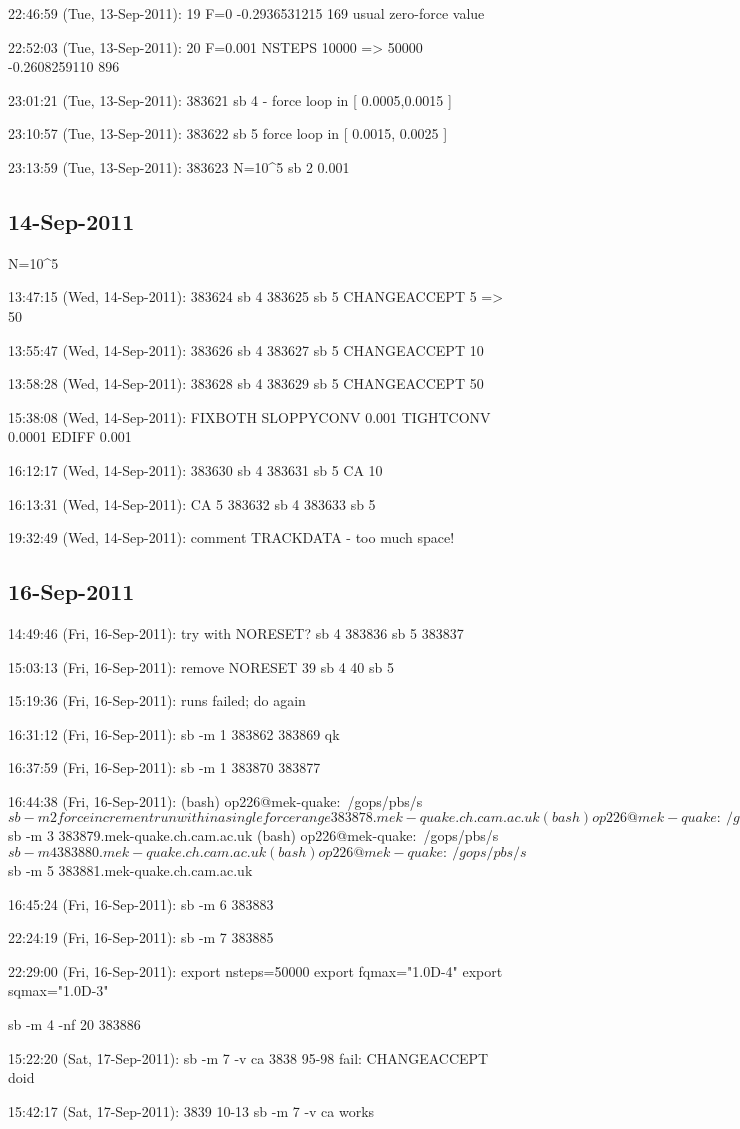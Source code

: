22:46:59 (Tue, 13-Sep-2011):
19 F=0
-0.2936531215 169  usual zero-force value 


22:52:03 (Tue, 13-Sep-2011):
	20
	F=0.001
	NSTEPS 10000 => 50000
-0.2608259110 896

23:01:21 (Tue, 13-Sep-2011):
	383621 sb 4 - force loop in [ 0.0005,0.0015 ]


23:10:57 (Tue, 13-Sep-2011):
	383622 sb 5 force loop in [ 0.0015, 0.0025 ] 


23:13:59 (Tue, 13-Sep-2011):
	383623
	N=10^5 sb 2 0.001


\subsection{14-Sep-2011}

N=10^5

13:47:15 (Wed, 14-Sep-2011):
383624 sb 4 
383625 sb 5 
CHANGEACCEPT 5 => 50

13:55:47 (Wed, 14-Sep-2011):
383626 sb 4
383627 sb 5
CHANGEACCEPT 10

13:58:28 (Wed, 14-Sep-2011):
383628 sb 4
383629 sb 5
CHANGEACCEPT 50


15:38:08 (Wed, 14-Sep-2011):
FIXBOTH
SLOPPYCONV 0.001
TIGHTCONV  0.0001
EDIFF 0.001


16:12:17 (Wed, 14-Sep-2011):
383630 sb 4
383631 sb 5
CA 10


16:13:31 (Wed, 14-Sep-2011):
CA 5
383632 sb 4
383633 sb 5

19:32:49 (Wed, 14-Sep-2011):
comment TRACKDATA - too much space!
\subsection{16-Sep-2011}

14:49:46 (Fri, 16-Sep-2011):
	try with NORESET?
	sb 4 383836
	sb 5 383837

15:03:13 (Fri, 16-Sep-2011):
	remove NORESET
	39 sb 4
	40 sb 5

15:19:36 (Fri, 16-Sep-2011):
runs failed; do again

16:31:12 (Fri, 16-Sep-2011):
	sb -m 1
	383862 383869
	qk

16:37:59 (Fri, 16-Sep-2011):
	sb -m 1
	383870 383877

16:44:38 (Fri, 16-Sep-2011):
	(bash) op226@mek-quake:~/gops/pbs/s$ sb -m 2
	force increment run within a single force range
	383878.mek-quake.ch.cam.ac.uk
	(bash) op226@mek-quake:~/gops/pbs/s$ sb -m 3
	383879.mek-quake.ch.cam.ac.uk
	(bash) op226@mek-quake:~/gops/pbs/s$ sb -m 4
	383880.mek-quake.ch.cam.ac.uk
	(bash) op226@mek-quake:~/gops/pbs/s$ sb -m 5
	383881.mek-quake.ch.cam.ac.uk

16:45:24 (Fri, 16-Sep-2011):
	sb -m 6
	383883
	
22:24:19 (Fri, 16-Sep-2011):
	sb -m 7
	383885

22:29:00 (Fri, 16-Sep-2011):
	export nsteps=50000
	export fqmax="1.0D-4"
	export sqmax="1.0D-3"

	sb -m 4 -nf 20
	383886

15:22:20 (Sat, 17-Sep-2011):
	sb -m 7 -v ca
	3838 95-98
	fail: CHANGEACCEPT doid

15:42:17 (Sat, 17-Sep-2011):
	3839 10-13
	sb -m 7 -v ca
	works

